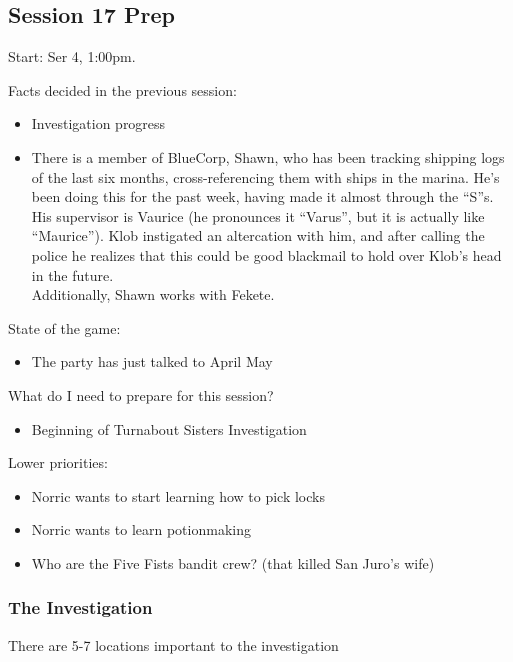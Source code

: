\subsection{Session 17 Prep}
Start: Ser 4, 1:00pm.

Facts decided in the previous session:
\begin{itemize}
\item Investigation progress
\item There is a member of BlueCorp, Shawn, who has been tracking shipping logs of the last six months, cross-referencing them with ships in the marina. He's been doing this for the past week, having made it almost through the ``S''s. His supervisor is Vaurice (he pronounces it ``Varus'', but it is actually like ``Maurice''). Klob instigated an altercation with him, and after calling the police he realizes that this could be good blackmail to hold over Klob's head in the future.\\
Additionally, Shawn works with Fekete.
\end{itemize}

State of the game:
\begin{itemize}
\item The party has just talked to April May
\end{itemize}

What do I need to prepare for this session?
\begin{itemize}
\item Beginning of Turnabout Sisters Investigation
\end{itemize}

Lower priorities:
\begin{itemize}
\item Norric wants to start learning how to pick locks
\item Norric wants to learn potionmaking
\item Who are the Five Fists bandit crew? (that killed San Juro's wife)
\end{itemize}



\subsubsection{The Investigation}
There are 5-7 locations important to the investigation

